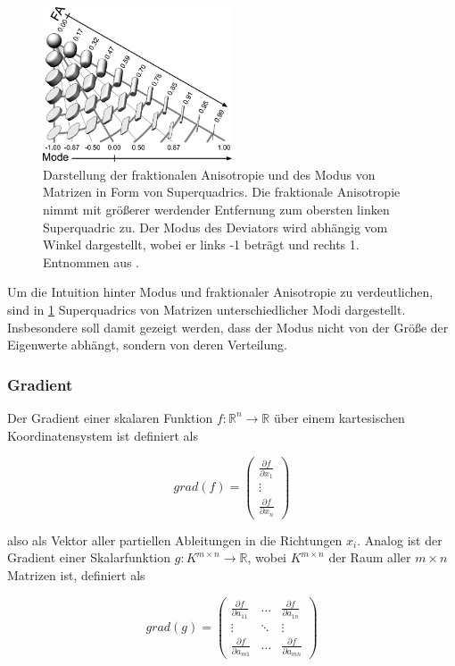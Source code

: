 \documentclass[a4paper,fontsize=12pt,toc=bib,halfparskip,ngerman]{scrartcl}
\begin{document}
\begin{figure}
	\centering
	\includegraphics[width=0.5\textwidth]{pictures/001.png}
	\caption{Darstellung der fraktionalen Anisotropie und des Modus von Matrizen in Form von Superquadrics\cite{kindlmann2004superquadric}. Die fraktionale Anisotropie nimmt mit gr\"o{\ss}erer werdender Entfernung zum obersten linken Superquadric zu. Der Modus des Deviators wird abh\"angig vom Winkel dargestellt, wobei er links -1 betr\"agt und rechts 1. Entnommen aus \cite[S.~140]{ennis2006orthogonal}.}
	\label{Modus}
\end{figure}
Um die Intuition hinter Modus und fraktionaler Anisotropie zu verdeutlichen, sind in \cref{Modus} Superquadrics von Matrizen unterschiedlicher Modi dargestellt. Insbesondere soll damit gezeigt werden, dass der Modus nicht von der Gr\"o{\ss}e der Eigenwerte abh\"angt, sondern von deren Verteilung.

\subsubsection{Gradient}
Der Gradient einer skalaren Funktion $f: \mathbb{R}^n \rightarrow \mathbb{R}$  \"uber einem kartesischen Koordinatensystem ist definiert als

\begin{equation}
	grad(f) = 	
	\begin{pmatrix}
		\frac{\partial f}{\partial x_1} \\
		\vdots \\
		\frac{\partial f}{\partial x_n}
	\end{pmatrix}
\end{equation}

also als Vektor aller partiellen Ableitungen in die Richtungen $x_i$. Analog ist der Gradient einer Skalarfunktion $g: K^{m\times n} \rightarrow \mathbb{R}$, wobei $K^{m\times n}$ der Raum aller $m\times n$ Matrizen ist, definiert als

\begin{equation}
	grad(g) =
	\begin{pmatrix}
		\frac{\partial f}{\partial a_{11}} & \dots & \frac{\partial f}{\partial a_{1n}}  \\
		\vdots & \ddots & \vdots \\
		\frac{\partial f}{\partial a_{m1}} & \dots & \frac{\partial f}{\partial a_{mn}} 
	\end{pmatrix}
\end{equation}
\end{document}
